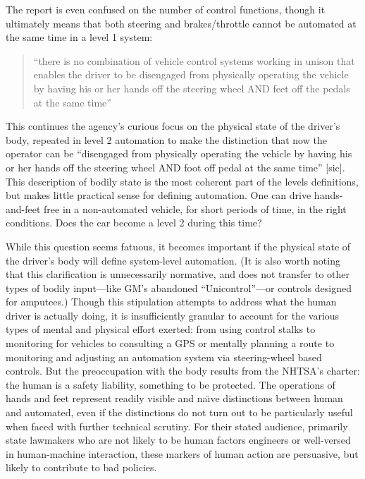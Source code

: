 The report is even confused on the number of control functions, though
it ultimately means that both steering and brakes/throttle cannot be
automated at the same time in a level 1 system: 

\begin{quote}
``there is no combination of vehicle control systems working in unison
that enables the driver to be disengaged from physically operating the
vehicle by having his or her hands off the steering wheel AND feet off
the pedals at the same time''\cite{???}
\end{quote}

This continues the agency's curious focus on the physical state of the
driver's body, repeated in level 2 automation to make the distinction
that now the operator can be ``disengaged from physically operating the
vehicle by having his or her hands off the steering wheel AND foot off
pedal at the same time'' [sic].\cite{???} This description of bodily state is
the most coherent part of the levels definitions, but makes little
practical sense for defining automation. One can drive hands-and-feet
free in a non-automated vehicle, for short periods of time, in the
right conditions. Does the car become a level 2 during this time?

While this question seems fatuous, it becomes important if the
physical state of the driver's body will define system-level
automation. (It is also worth noting that this clarification is
unnecessarily normative, and does not transfer to other types of
bodily input—like GM's abandoned ``Unicontrol''\cite{???}—or controls designed
for amputees.) Though this stipulation attempts to address what the
human driver is actually doing, it is insufficiently granular to
account for the various types of mental and physical effort exerted:
from using control stalks to monitoring for vehicles to consulting a
GPS or mentally planning a route to monitoring and adjusting an
automation system via steering-wheel based controls. But the
preoccupation with the body results from the NHTSA's charter: the
human is a safety liability, something to be protected. The operations
of hands and feet represent readily visible and na\"{\i}ve distinctions
between human and automated, even if the distinctions do not turn out
to be particularly useful when faced with further technical scrutiny.
For their stated audience, primarily state lawmakers who are not
likely to be human factors engineers or well-versed in human-machine
interaction, these markers of human action are persuasive, but likely
to contribute to bad policies.

